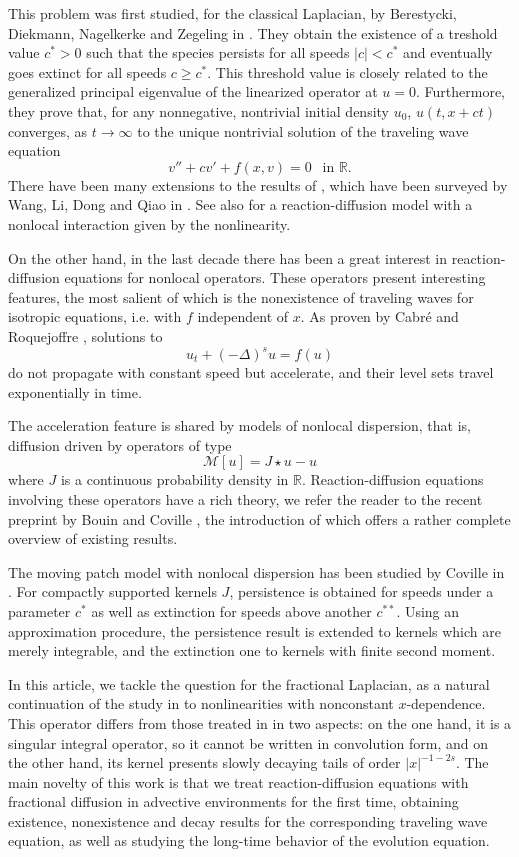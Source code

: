 \documentclass[11pt,a4paper]{amsart}
\newcommand{\R}{\mathbb{R}}
\begin{document}
This problem was first studied, for the classical Laplacian, by Berestycki, Diekmann, Nagelkerke and Zegeling in \cite{B+09}. They obtain the existence of a treshold value $c^* >0 $ such that the species persists for all speeds $|c| < c^*$ and eventually goes extinct for all speeds $c\geq c^*$. This threshold value is closely related to the generalized principal eigenvalue of the linearized operator at $u=0$. Furthermore, they prove that, for any nonnegative, nontrivial initial density $u_0$, $u(t,x+ct)$ converges, as $t\rightarrow \infty$ to the unique nontrivial solution of the traveling wave equation 
\[ v'' + cv' +  f(x,v)   =0 ~~ \text{ in } \R.\]
There have been many extensions to the results of \cite{B+09}, which have been surveyed by Wang, Li, Dong and Qiao in \cite{W+22}. See also \cite{ABR17} for a reaction-diffusion model with a nonlocal interaction given by the nonlinearity.

On the other hand, in the last decade there has been a great interest in reaction-diffusion equations for nonlocal operators. These operators present interesting features, the most salient of which is the nonexistence of traveling waves for isotropic equations, i.e. with $f$ independent of $x$. As proven by Cabré and Roquejoffre \cite{CR13}, solutions to 
\[u_t + (-\Delta)^s u = f(u)\]
do not propagate with constant speed but accelerate, and their level sets travel exponentially in time.

The acceleration feature is shared by models of nonlocal dispersion, that is, diffusion driven by operators of type 
\[\mathcal{M}[u] = J \star u -u \]
where $J$ is a continuous probability density in $\R$. Reaction-diffusion equations involving these operators have a rich theory, we refer the reader to the recent preprint by Bouin and Coville \cite{BC25}, the introduction of which offers a rather complete overview of existing results. 

The moving patch model with nonlocal dispersion has been studied by Coville in \cite{C21}. For compactly supported kernels $J$, persistence is obtained for speeds under a parameter $c^*$ as well as extinction for speeds above another $c^{**}$. Using an approximation procedure, the persistence result is extended to kernels which are merely integrable, and the extinction one to kernels with finite second moment.

In this article, we tackle the question for the fractional Laplacian, as a natural continuation of the study in \cite{CR13} to nonlinearities with nonconstant $x$-dependence. This operator differs from those treated in \cite{C21} in two aspects: on the one hand, it is a singular integral operator, so it cannot be written in convolution form, and on the other hand, its kernel presents slowly decaying tails of order $|x|^{-1-2s}$. The main novelty of this work is that we treat reaction-diffusion equations with fractional diffusion in advective environments for the first time, obtaining existence, nonexistence and decay results for the corresponding traveling wave equation, as well as studying the long-time behavior of the evolution equation.
\end{document}
